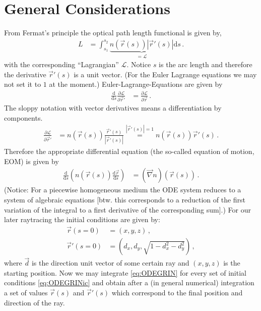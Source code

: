 \documentclass[12pt,a4paper,twoside,openright,BCOR10mm,headsepline,titlepage,abstracton,chapterprefix,final]{scrreprt}
\begin{document}
\section{General Considerations}
From Fermat's principle the optical path length functional is given by,
\begin{align}
 L &= \int_{s_1}^{s_2} \underbrace{n(\vec{r}(s)) |\vec{r}'(s)|}_{=\mathcal{L}} \text{d}s\,.\label{eq:fermatiso}
\end{align}
with the corresponding ``Lagrangian'' $\mathcal{L}$.
Notice $s$ is the arc length and therefore the derivative $\vec{r}'(s)$ is a unit vector. (For the Euler Lagrange
equations we may not set it to $1$ at the moment.)
Euler-Lagrange-Equations are given by
\begin{align}
 \frac{\text{d}}{\text{d}s} \frac{\partial \mathcal{L}}{\partial \vec{r}'} &= \frac{\partial \mathcal{L}}{\partial \vec{r}}\,.
\end{align}
The sloppy notation with vector derivatives means a differentiation by components.
\begin{align}
 \frac{\partial \mathcal{L}}{\partial \vec{r}'} &= n(\vec{r}(s)) \frac{\vec{r}'(s)}{|\vec{r}'(s)|} \stackrel{|\vec{r}'(s)|=1}{=} n(\vec{r}(s))\vec{r}'(s)\,.
\end{align}
Therefore the appropriate differential equation (the so-called equation of motion, EOM) is given by
\begin{align}
 \frac{\text{d}}{\text{d}s} \left(n(\vec{r}(s)) \frac{\text{d}\vec{r}}{\text{d}s}\right) &= (\vec{\nabla} n)(\vec{r}(s)) \label{eq:ODEGRIN}\,.
\end{align}
(Notice: For a piecewise homogeneous medium the ODE system reduces to a system of algebraic equations 
[btw. this corresponds to a reduction of the
first variation of the integral to a first derivative of the corresponding sum].) 
For our later raytracing the initial conditions are given by:
\begin{subequations}
\label{eq:ODEGRINic}
\begin{align}
 \vec{r}(s=0) &= (x,y,z)\,,\\
 \vec{r}'(s=0) &= (d_x, d_y, \sqrt{1-d_x^2-d_y^2})\,,
\end{align}
\end{subequations}
where $\vec{d}$ is the direction unit vector of some certain ray and $(x,y,z)$ is the starting position.
Now we may integrate \eqref{eq:ODEGRIN} for every set of initial conditions \eqref{eq:ODEGRINic}
and obtain after a (in general numerical) integration a set of values $\vec{r}(s)$ and $\vec{r}'(s)$
which correspond to the final position and direction of the ray.
\end{document}
